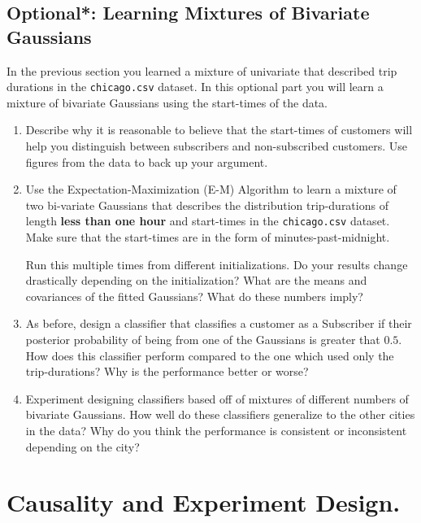 \documentclass[12pt, answers, addpoints]{exam}
\begin{document}
\subsection{Optional*: Learning Mixtures of Bivariate Gaussians}

In the previous section you learned a mixture of univariate that described trip durations in the  \texttt{chicago.csv} dataset. In this optional part you will learn a mixture of bivariate Gaussians using the start-times of the data.



\begin{enumerate}
\item Describe why it is reasonable to believe that the start-times of customers will help you distinguish between subscribers and non-subscribed customers. Use figures from the data to back up your argument.\\


\item Use the Expectation-Maximization (E-M) Algorithm to learn a mixture of two bi-variate Gaussians that describes the distribution trip-durations of length \textbf{less than one hour} and start-times in the \texttt{chicago.csv} dataset. Make sure that the start-times are in the form of minutes-past-midnight.

Run this multiple times from different initializations. Do your results change drastically depending on the initialization? What are the means and covariances of the fitted Gaussians? What do these numbers imply? \\

\item As before, design a classifier that classifies a customer as a Subscriber if their posterior probability of being from one of the Gaussians is greater that $0.5$. How does this classifier perform compared to the one which used only the trip-durations? Why is the performance better or worse?

\item Experiment designing classifiers based off of mixtures of different numbers of bivariate Gaussians. How well do these classifiers generalize to the other cities in the data? Why do you think the performance is consistent or inconsistent depending on the city?

\end{enumerate}

\section{Causality and Experiment Design.}
\end{document}
